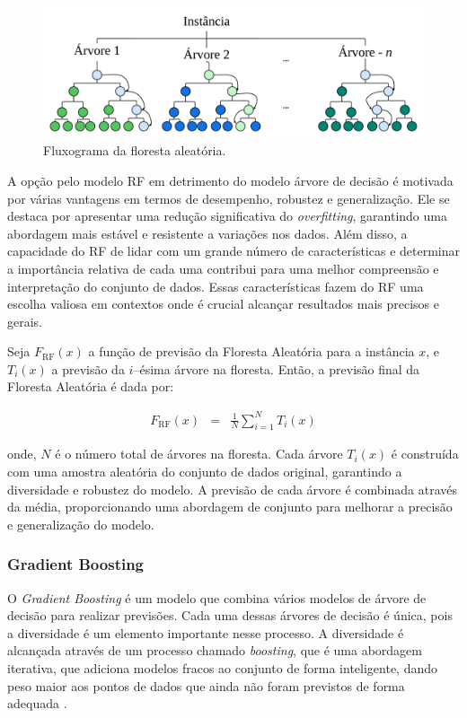  \begin{figure}[!htb]
 	\centering
 	\caption{Fluxograma da floresta aleatória.}
 	\label{fig:rf}
 	\includegraphics[width=\linewidth]{Modelos/Figuras/RF.pdf}
 \end{figure}
 
A opção pelo modelo RF em detrimento do modelo árvore de decisão é motivada por várias vantagens em termos de desempenho, robustez e generalização. Ele se destaca por apresentar uma redução significativa do \textit{overfitting}, garantindo uma abordagem mais estável e resistente a variações nos dados. Além disso, a capacidade do RF de lidar com um grande número de características e determinar a importância relativa de cada uma contribui para uma melhor compreensão e interpretação do conjunto de dados. Essas características fazem do RF uma escolha valiosa em contextos onde é crucial alcançar resultados mais precisos e gerais.

Seja $ F_{\text{RF}}(x) $ a função de previsão da Floresta Aleatória para a instância $ x $, e $ T_i(x) $ a previsão da $ i $--ésima árvore na floresta. Então, a previsão final da Floresta Aleatória é dada por:

\begin{eqnarray}
	F_{\text{RF}}(x) &=& \frac{1}{N} \sum_{i=1}^{N} T_i(x) 
\end{eqnarray}

\noindent onde, $ N $ é o número total de árvores na floresta. Cada árvore $ T_i(x) $ é construída com uma amostra aleatória do conjunto de dados original, garantindo a diversidade e robustez do modelo. A previsão de cada árvore é combinada através da média, proporcionando uma abordagem de conjunto para melhorar a precisão e generalização do modelo.
 
 \subsubsection{Gradient Boosting}\label{subsubsec:lgbxgb}
 
 O \textit{Gradient Boosting} é um modelo que combina vários modelos de árvore de decisão para realizar previsões. Cada uma dessas árvores de decisão é única, pois a diversidade é um elemento importante nesse processo. A diversidade é alcançada através de um processo chamado \textit{boosting}, que é uma abordagem iterativa, que adiciona modelos fracos ao conjunto de forma inteligente, dando peso maior aos pontos de dados que ainda não foram previstos de forma adequada \cite{BUEECHI2023109596}. 
 
